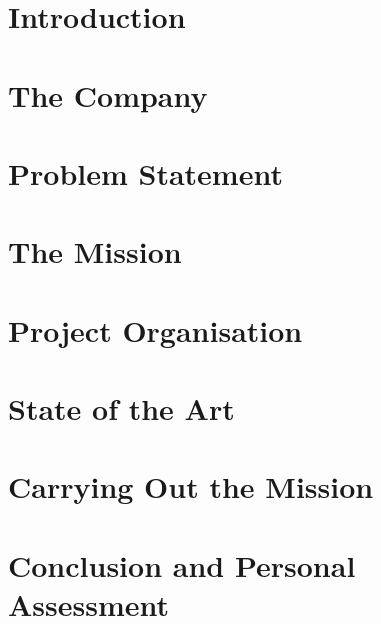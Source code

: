 \documentclass[a4paper, 11pt, oneside]{article}
\begin{document}
\color{altenNavy}



\clearpage
{}


\clearpage


\clearpage


\clearpage


\clearpage
\tableofcontents

\clearpage
\listoffigures

\clearpage
\listoftables

\clearpage
{}
\section{Introduction}
\label{sec:intro}


\section{The Company}
\label{sec:entreprise}


\section{Problem Statement}
\label{sec:problematique}


\section{The Mission}
\label{sec:mission}


\section{Project Organisation}
\label{sec:organisation}


\section{State of the Art}
\label{sec:etatdelart}


\section{Carrying Out the Mission}
\label{sec:realisation}


\section{Conclusion and Personal Assessment}
\label{sec:conclusion}


\clearpage
\printbibliography[heading=bibintoc, title={Bibliography}]

\clearpage
\appendix




\end{document}
